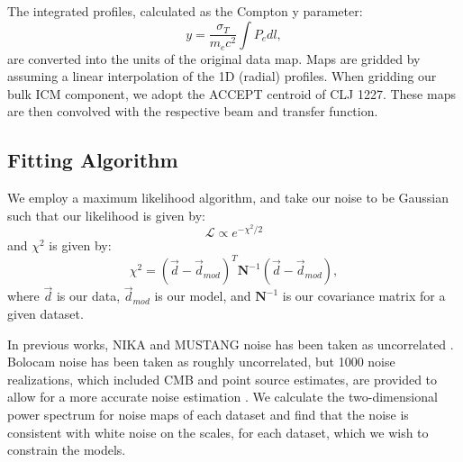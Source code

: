 \documentclass[twocolumn,traditabstract]{aa}
\begin{document}
The integrated profiles, calculated as the Compton y parameter:
\begin{equation}
  y = \frac{\sigma_T}{m_e c^2} \int P_e dl,
  \label{eqn:compton_y}
\end{equation}
are converted into the units of the original data map. Maps are gridded by assuming a linear interpolation
of the 1D (radial) profiles.
When gridding our bulk ICM component, we adopt the ACCEPT centroid of CLJ 1227.
These maps are then convolved with the respective beam and transfer function.


\subsection{Fitting Algorithm}

We employ a maximum likelihood algorithm, and take our noise to be Gaussian such that our likelihood is given
by:
\begin{equation}
  \mathcal{L} \propto e^{-\chi^2 / 2} 
  \label{eqn:likelihood}
\end{equation}
and $\chi^2$ is given by:
\begin{equation}
  \chi^2 = (\overrightarrow{d} - \overrightarrow{d}_{mod})^T \mathbf{N}^{-1} (\overrightarrow{d} - \overrightarrow{d}_{mod}),
  \label{eqn:chi_sq}
\end{equation}
where $\overrightarrow{d}$ is our data, $\overrightarrow{d}_{mod}$ is our model, and $\mathbf{N}^{-1}$ is our
covariance matrix for a given dataset.

In previous works, NIKA and MUSTANG noise has been taken as uncorrelated \citep[e.g.][]{romero2015a,romero2016,adam2015}.
Bolocam noise has been taken as roughly uncorrelated, but 1000 noise realizations, which included CMB and point
source estimates, are provided to allow for a more accurate noise estimation \citep{sayers2011}.
We calculate the two-dimensional power spectrum for noise maps of each dataset and find that the noise is consistent
with white noise on the scales, for each dataset, which we wish to constrain the models.
\end{document}
